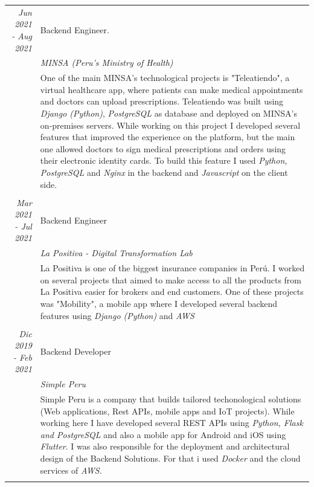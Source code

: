 \documentclass[a4paper,10pt]{article}
\begin{document}
\begin{longtable}{r|p{11cm}}
  \emph{Jun 2021 - Aug 2021} & Backend Engineer.\\& \emph{MINSA (Peru's Ministry of Health)}\\ & \footnotesize{One of the main MINSA's technological projects is "Teleatiendo", a virtual healthcare app, where patients can make medical appointments and doctors can upload prescriptions. Teleatiendo was built using \emph{Django (Python)}, \emph{PostgreSQL} as database and deployed on MINSA's on-premises servers. While working on this project I developed several features that improved the experience on the platform, but the main one allowed doctors to sign medical prescriptions and orders using their electronic identity cards. To build this feature I used \emph{Python, PostgreSQL} and \emph{Nginx} in the backend and \emph{Javascript} on the client side.}\\&\\
  \emph{Mar 2021 - Jul 2021} & Backend Engineer\\& \emph{La Positiva - Digital Transformation Lab}\\ & \footnotesize{La Positiva is one of the biggest insurance companies in Perú. I worked on several projects that aimed to make access to all the products from La Positiva easier for brokers and end customers. One of these projects was "Mobility", a mobile app where I developed several backend features using \emph{ Django (Python)} and \emph{AWS}}\\&\\
  \emph{Dic 2019 - Feb 2021} & Backend Developer \\&\emph{Simple Peru}\\&\footnotesize{Simple Peru is a company that builds tailored techonological solutions (Web applications, Rest APIs, mobile apps and IoT projects). While working here I have developed several REST APIs using \emph{Python, Flask and PostgreSQL} and also a mobile app for Android and iOS using \emph{Flutter}. I was also responsible for the deployment and architectural design of the Backend Solutions. For that i used \emph{Docker} and the cloud services of \emph{AWS}.}\\&\\

\end{longtable}
\end{document}
